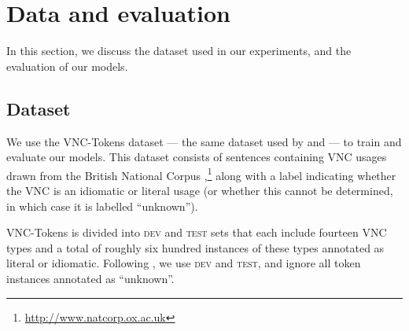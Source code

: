 \documentclass[11pt,a4paper]{article}
\newcommand{\dev}{\textsc{dev}\xspace}
\newcommand{\test}{\textsc{test}\xspace}
\begin{document}
\section{Data and evaluation}


In this section, we discuss the dataset used in our experiments, and
the evaluation of our models.

\subsection{Dataset}\label{dataset}

We use the VNC-Tokens dataset \citep{Cook2008} --- the same dataset
used by  and  --- to
train and evaluate our models. This dataset consists of sentences
containing VNC usages drawn from the British National Corpus
\citep{Burnard2000},\footnote{\url{http://www.natcorp.ox.ac.uk}} along
with a label indicating whether the VNC is an idiomatic or literal
usage (or whether this cannot be determined, in which case it is
labelled ``unknown''). 



VNC-Tokens is divided into \dev and \test sets that each include
fourteen VNC types and a total of roughly six hundred instances of
these types annotated as literal or idiomatic. Following
, we use \dev and \test, and ignore all
token instances annotated as ``unknown''.






\end{document}
